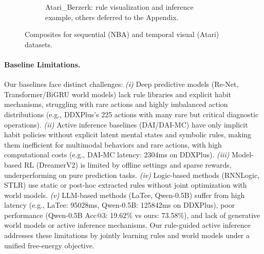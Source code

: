\documentclass{article} %
\newcommand{\revise}[1]{#1}
\begin{document}
\begin{figure}[t]
\begin{subfigure}[t]{\linewidth}
    \caption{Atari\_Berzerk: rule visualization and inference example, others deferred to the Appendix.}
    \label{fig:atari_composite}
  \end{subfigure}

  \vspace{-1mm}
  \caption{Composites for sequential (NBA) and temporal visual (Atari) datasets.}
  \label{fig:composite_all}
\end{figure}



\paragraph{Baseline Limitations.}
\revise{Our baselines face distinct challenges: \emph{(i)} Deep predictive models (Re-Net, Transformer/BiGRU world models) lack rule libraries and explicit habit mechanisms, struggling with rare actions and highly imbalanced action distributions (e.g., DDXPlus's 225 actions with many rare but critical diagnostic operations). \emph{(ii)} Active inference baselines (DAI/DAI-MC) have only implicit habit policies without explicit latent mental states and symbolic rules, making them inefficient for multimodal behaviors and rare actions, with high computational costs (e.g., DAI-MC latency: 2304ms on DDXPlus). \emph{(iii)} Model-based RL (DreamerV2) is limited by offline settings and sparse rewards, underperforming on pure prediction tasks. \emph{(iv)} Logic-based methods (RNNLogic, STLR) use static or post-hoc extracted rules without joint optimization with world models. \emph{(v)} LLM-based methods (LaTee, Qwen-0.5B) suffer from high latency (e.g., LaTee: 95028ms, Qwen-0.5B: 125842ms on DDXPlus), poor performance (Qwen-0.5B Acc@3: 19.62\% vs ours: 73.58\%), and lack of generative world models or active inference mechanisms. Our rule-guided active inference addresses these limitations by jointly learning rules and world models under a unified free-energy objective.}


\end{document}
